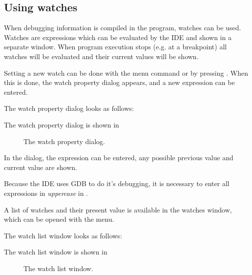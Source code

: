 %
%
\subsection{Using watches}
When debugging information is compiled in the program, watches can be used.
Watches are expressions which can be evaluated by the IDE and shown in a
separate window. When program execution stops (e.g. at a breakpoint) all
watches will be evaluated and their current values will be shown.

Setting a new watch can be done with the  menu 
command or by pressing . When this is done, the watch
property dialog appears, and a new expression can be entered.
\begin{htmlonly}
The watch property dialog looks as follows:
\end{htmlonly}
\begin{latexonly}
The watch property dialog is shown in 
\begin{figure}[ht]
\begin{center}
\caption{The watch property dialog.}\label{fig:watch}
\ifpdf
{}
\else
{}
\fi
\end{center}
\end{figure}
\end{latexonly}
In the dialog, the expression can be entered, any possible previous value
and current value are shown.
\begin{remark}
Because the IDE uses GDB to do it's debugging, it is necessary to enter all
expressions in {\em uppercase} in \freebsd. 
\end{remark}
A list of watches and their present value is available in the watches
window, which can be opened with the  menu.
\begin{htmlonly}
The watch list window looks as follows:
\end{htmlonly}
\begin{latexonly}
The watch list window is shown in 
\begin{figure}[ht]
\begin{center}
\caption{The watch list window.}\label{fig:watchlst}
\ifpdf
{}
\else
{}
\fi
\end{center}
\end{figure}
\end{latexonly}

